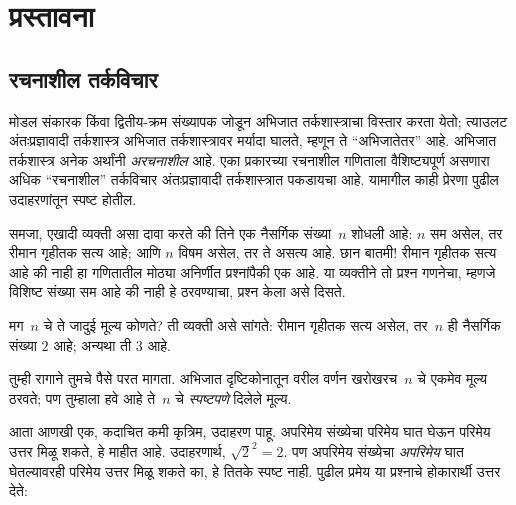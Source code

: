 \chapter{प्रस्तावना}\label{int:int:chap}










\section{रचनाशील तर्कविचार}\label{int:int:cr:sec}

मोडल संकारक किंवा द्वितीय-क्रम संख्यापक जोडून अभिजात
तर्कशास्त्राचा विस्तार करता येतो; त्याउलट
अंतःप्रज्ञावादी तर्कशास्त्र अभिजात तर्कशास्त्रावर
मर्यादा घालते, म्हणून ते ``अभिजातेतर'' आहे.
अभिजात तर्कशास्त्र अनेक अर्थांनी \emph{अरचनाशील}
आहे. एका प्रकारच्या रचनाशील गणिताला वैशिष्ट्यपूर्ण
असणारा अधिक ``रचनाशील'' तर्कविचार अंतःप्रज्ञावादी
तर्कशास्त्रात पकडायचा आहे. यामागील काही प्रेरणा
पुढील उदाहरणांतून स्पष्ट होतील.

समजा, एखादी व्यक्ती असा दावा करते की तिने एक नैसर्गिक
संख्या~$n$ शोधली आहे: $n$ सम असेल, तर रीमान
गृहीतक सत्य आहे; आणि $n$ विषम असेल, तर ते असत्य
आहे. छान बातमी!{} रीमान गृहीतक सत्य आहे की नाही
हा गणितातील मोठ्या अनिर्णीत प्रश्नांपैकी एक आहे.
या व्यक्तीने तो प्रश्न गणनेचा, म्हणजे विशिष्ट संख्या
सम आहे की नाही हे ठरवण्याचा, प्रश्न केला असे दिसते.

मग~$n$ चे ते जादुई मूल्य कोणते? ती व्यक्ती असे
सांगते: रीमान गृहीतक सत्य असेल, तर~$n$ ही नैसर्गिक
संख्या $2$ आहे; अन्यथा ती $3$ आहे.

तुम्ही रागाने तुमचे पैसे परत मागता. अभिजात दृष्टिकोनातून
वरील वर्णन खरोखरच~$n$ चे एकमेव मूल्य ठरवते;
पण तुम्हाला हवे आहे ते~$n$ चे \emph{स्पष्टपणे}
दिलेले मूल्य.

आता आणखी एक, कदाचित कमी कृत्रिम, उदाहरण पाहू.
अपरिमेय संख्येचा परिमेय घात घेऊन परिमेय उत्तर मिळू
शकते, हे माहीत आहे. उदाहरणार्थ, $\sqrt{2}^2 = 2$.
पण अपरिमेय संख्येचा \emph{अपरिमेय} घात घेतल्यावरही
परिमेय उत्तर मिळू शकते का, हे तितके स्पष्ट नाही.
पुढील प्रमेय या प्रश्नाचे होकारार्थी उत्तर देते:


